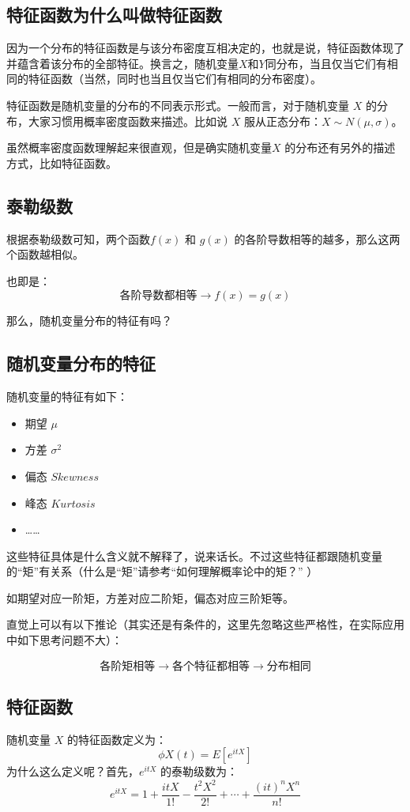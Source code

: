 \documentclass[12pt]{article}
\begin{document}
\subsection{特征函数为什么叫做特征函数\cite{Why_Called_Feature_Function}\cite{Understand_Feature_Function}}
因为一个分布的特征函数是与该分布密度互相决定的，也就是说，特征函数体现了并蕴含着该分布的全部特征。换言之，随机变量$X$和$Y$同分布，当且仅当它们有相同的特征函数（当然，同时也当且仅当它们有相同的分布密度）。

特征函数是随机变量的分布的不同表示形式。一般而言，对于随机变量 $X$ 的分布，大家习惯用概率密度函数来描述。比如说 $X$ 服从正态分布：$X \sim N(\mu,\sigma)$。

虽然概率密度函数理解起来很直观，但是确实随机变量$X$ 的分布还有另外的描述方式，比如特征函数。

\subsection{泰勒级数}
根据泰勒级数可知，两个函数$f(x)$ 和 $g(x)$ 的各阶导数相等的越多，那么这两个函数越相似。

也即是：
$$
\textbf{各阶导数都相等} \rightarrow f(x) = g(x)
$$

那么，随机变量分布的特征有吗？

\subsection{随机变量分布的特征}
随机变量的特征有如下：
\begin{itemize}
    \item 期望 $\mu$
    \item 方差 $\sigma^2$
    \item 偏态 $Skewness$
    \item 峰态 $Kurtosis$
    \item ……
\end{itemize}

这些特征具体是什么含义就不解释了，说来话长。不过这些特征都跟随机变量的“矩”有关系（什么是“矩”请参考“如何理解概率论中的矩？” ）

如期望对应一阶矩，方差对应二阶矩，偏态对应三阶矩等。

直觉上可以有以下推论（其实还是有条件的，这里先忽略这些严格性，在实际应用中如下思考问题不大）：

$$
\textbf{各阶矩相等} \rightarrow \textbf{各个特征都相等} \rightarrow \textbf{分布相同} 
$$

\subsection{特征函数}
随机变量 $X$ 的特征函数定义为：
$$
\phi X(t) = E[e^{itX}]
$$
为什么这么定义呢？首先，$e^{itX}$ 的泰勒级数为：
$$
e^{itX} = 1 + \frac{itX}{1!} - \frac{t^2X^2}{2!} + \cdots + \frac{(it)^nX^n}{n!}
$$
\end{document}
